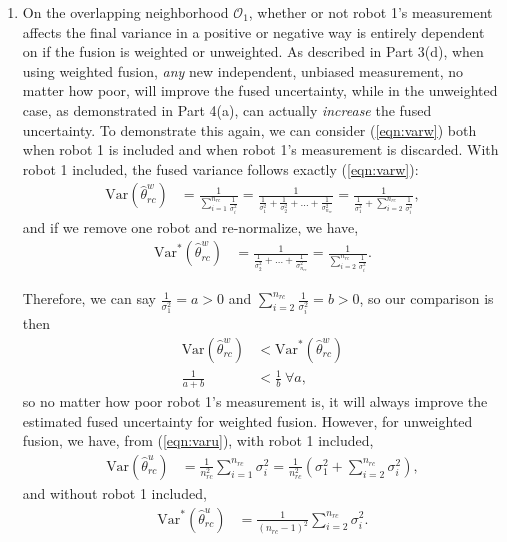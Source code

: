 \documentclass[12pt]{article}
\begin{document}
\begin{enumerate}[label=(\alph*)]
    \item On the overlapping neighborhood $\mathcal O_1$, whether or not robot 1's measurement affects the final variance in a positive or negative way is entirely dependent on if the fusion is weighted or unweighted. As described in Part 3(d), when using weighted fusion, \textit{any} new independent, unbiased measurement, no matter how poor, will improve the fused uncertainty, while in the unweighted case, as demonstrated in Part 4(a), can actually \textit{increase} the fused uncertainty. To demonstrate this again, we can consider (\ref{eqn:varw}) both when robot 1 is included and when robot 1's measurement is discarded. With robot 1 included, the fused variance follows exactly (\ref{eqn:varw}):
    \begin{align*}
        \text{Var}(\hat\theta_{rc}^w)&=\frac{1}{\sum_{i=1}^{n_{rc}}\frac{1}{\sigma_i^2}}=\frac{1}{\frac{1}{\sigma_1^2}+\frac{1}{\sigma_2^2}+\dots+\frac{1}{\sigma_{n_{rc}}^2}}=\frac{1}{\frac{1}{\sigma_1^2}+\sum_{i=2}^{n_{rc}}\frac{1}{\sigma_i^2}},
    \end{align*}
    and if we remove one robot and re-normalize, we have,
    \begin{align*}
        \text{Var}^*(\hat\theta_{rc}^w)&=\frac{1}{\frac{1}{\sigma_2^2}+\dots+\frac{1}{\sigma_{n_{rc}}^2}}=\frac{1}{\sum_{i=2}^{n_{rc}}\frac{1}{\sigma_i^2}}.
    \end{align*}

    Therefore, we can say $\frac{1}{\sigma_1^2}=a>0$ and $\sum_{i=2}^{n_{rc}}\frac{1}{\sigma_i^2}=b>0$, so our comparison is then
    \begin{align*}
        \text{Var}(\hat\theta_{rc}^w)&<\text{Var}^*(\hat\theta_{rc}^w)\\
        \frac{1}{a+b}&<\frac{1}{b}\ \forall a,
    \end{align*}
    so no matter how poor robot 1's measurement is, it will always improve the estimated fused uncertainty for weighted fusion. However, for unweighted fusion, we have, from (\ref{eqn:varu}), with robot 1 included,
    \begin{align*}
        \text{Var}(\hat\theta_{rc}^u)&=\frac{1}{n_{rc}^2}\sum_{i=1}^{n_{rc}}\sigma_i^2=\frac{1}{n_{rc}^2}\left(\sigma_1^2+\sum_{i=2}^{n_{rc}}\sigma_i^2\right),
    \end{align*}
    and without robot 1 included,
    \begin{align*}
        \text{Var}^*(\hat\theta_{rc}^u)&=\frac{1}{(n_{rc}-1)^2}\sum_{i=2}^{n_{rc}}\sigma_i^2.
    \end{align*}


\end{enumerate}
\end{document}
